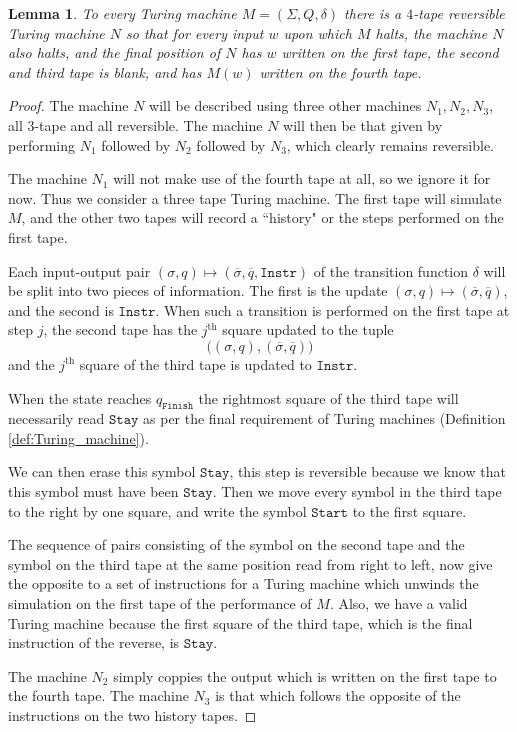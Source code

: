 \documentclass[12pt]{article}
\theoremstyle{plain}
\newtheorem{lemma}[thm]{Lemma}
\theoremstyle{definition}
\begin{document}
	
	
	
	
	\begin{lemma}\label{lem:reversible_three_tapes}
		To every Turing machine $M = (\Sigma, Q, \delta)$ there is a $4$-tape reversible Turing machine $N$ so that for every input $w$ upon which $M$ halts, the machine $N$ also halts, and the final position of $N$ has $w$ written on the first tape, the second and third tape is blank, and has $M(w)$ written on the fourth tape.
		\end{lemma}
	\begin{proof}
		The machine $N$ will be described using three other machines $N_1, N_2, N_3$, all $3$-tape and all reversible. The machine $N$ will then be that given by performing $N_1$ followed by $N_2$ followed by $N_3$, which clearly remains reversible.
		
		The machine $N_1$ will not make use of the fourth tape at all, so we ignore it for now. Thus we consider a three tape Turing machine. The first tape will simulate $M$, and the other two tapes will record a ``history" or the steps performed on the first tape.
		
		Each input-output pair $(\sigma, q) \longmapsto (\overline{\sigma}, \overline{q}, \texttt{Instr})$ of the transition function $\delta$ will be split into two pieces of information. The first is the update $(\sigma, q) \longmapsto (\overline{\sigma}, \overline{q})$, and the second is $\texttt{Instr}$. When such a transition is performed on the first tape at step $j$, the second tape has the $j^{\text{th}}$ square updated to the tuple
		\begin{equation}
			\big((\sigma, q), (\overline{\sigma}, \overline{q})\big)
			\end{equation}
		and the $j^{\text{th}}$ square of the third tape is updated to $\texttt{Instr}$.
		
		When the state reaches $q_{\texttt{Finish}}$ the rightmost square of the third tape will necessarily read $\texttt{Stay}$ as per the final requirement of Turing machines (Definition \ref{def:Turing_machine}).
		
		We can then erase this symbol $\texttt{Stay}$, this step is reversible because we know that this symbol must have been $\texttt{Stay}$. Then we move every symbol in the third tape to the right by one square, and write the symbol $\texttt{Start}$ to the first square.
		
		The sequence of pairs consisting of the symbol on the second tape and the symbol on the third tape at the same position read from right to left, now give the opposite to a set of instructions for a Turing machine which unwinds the simulation on the first tape of the performance of $M$. Also, we have a valid Turing machine because the first square of the third tape, which is the final instruction of the reverse, is $\texttt{Stay}$.
		
		The machine $N_2$ simply coppies the output which is written on the first tape to the fourth tape. The machine $N_3$ is that which follows the opposite of the instructions on the two history tapes.
		\end{proof}
\end{document}
